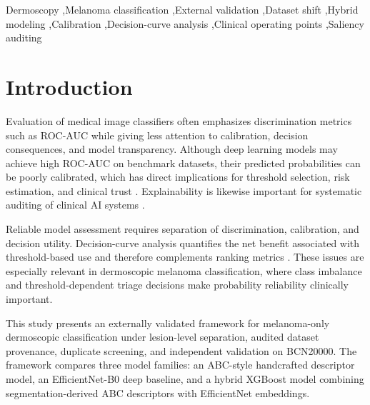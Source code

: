 \documentclass[preprint,12pt]{elsarticle}
\begin{document}
\begin{frontmatter}
\begin{abstract}
\textbf{Conclusions:} Hybrid ABC--deep representations improve dermoscopic melanoma ranking under measurable external dataset shift. The ABC components additionally enable clinical error profiling that identifies feature-poor melanomas as the dominant failure mode. Calibration, threshold utility, correction stability, segmentation robustness, and saliency faithfulness require separate evaluation and differ from discrimination performance.

\end{abstract}

\begin{keyword}
Dermoscopy \sep Melanoma classification \sep External validation \sep Dataset shift \sep Hybrid modeling \sep Calibration \sep Decision-curve analysis \sep Clinical operating points \sep Saliency auditing
\end{keyword}

\end{frontmatter}

\section{Introduction}

Evaluation of medical image classifiers often emphasizes discrimination metrics such as ROC-AUC while giving less attention to calibration, decision consequences, and model transparency. Although deep learning models may achieve high ROC-AUC on benchmark datasets, their predicted probabilities can be poorly calibrated, which has direct implications for threshold selection, risk estimation, and clinical trust \citep{SAMBYAL2023107816,carse2022calibration}. Explainability is likewise important for systematic auditing of clinical AI systems \citep{gerdes2024explainability,frasca2024explainable}.

Reliable model assessment requires separation of discrimination, calibration, and decision utility. Decision-curve analysis quantifies the net benefit associated with threshold-based use and therefore complements ranking metrics \citep{vickers2006decision,vancalster2025performance}. These issues are especially relevant in dermoscopic melanoma classification, where class imbalance and threshold-dependent triage decisions make probability reliability clinically important.

This study presents an externally validated framework for melanoma-only dermoscopic classification under lesion-level separation, audited dataset provenance, duplicate screening, and independent validation on BCN20000. The framework compares three model families: an ABC-style handcrafted descriptor model, an EfficientNet-B0 deep baseline, and a hybrid XGBoost model combining segmentation-derived ABC descriptors with EfficientNet embeddings.
\end{document}

